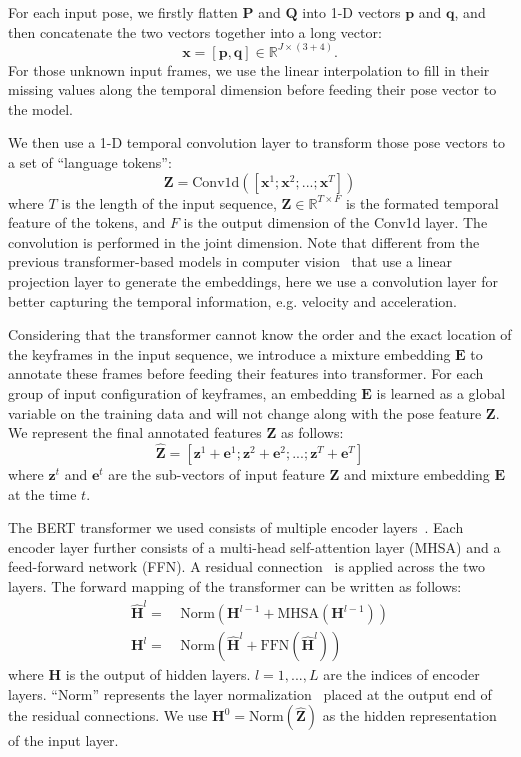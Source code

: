 \documentclass[10pt,twocolumn,letterpaper]{article}
\begin{document}
For each input pose, we firstly flatten $\bm{P}$ and $\bm{Q}$ into 1-D vectors $\bm{p}$ and $\bm{q}$, and then concatenate the two vectors together into a long vector:
\begin{equation}
\bm{x} = [\bm{p}, \bm{q}] \in \mathbb{R}^{J\times(3+4)}.
\end{equation}
For those unknown input frames, we use the linear interpolation to fill in their missing values along the temporal dimension before feeding their pose vector to the model.

We then use a 1-D temporal convolution layer to transform those pose vectors to a set of ``language tokens'':
\begin{equation}
\bm{Z} = \text{Conv1d}([\bm{x}^1;\bm{x}^2;...;\bm{x}^T])
\end{equation}
where $T$ is the length of the input sequence, $\bm{Z} \in \mathbb{R}^{T\times F}$ is the formated temporal feature of the tokens, and $F$ is the output dimension of the Conv1d layer. The convolution is performed in the joint dimension. Note that different from the previous transformer-based models in computer vision~\cite{dosovitskiy2020VIT} that use a linear projection layer to generate the embeddings, here we use a convolution layer for better capturing the temporal information, e.g. velocity and acceleration.

Considering that the transformer cannot know the order and the exact location of the keyframes in the input sequence, we introduce a mixture embedding $\bm{E}$ to annotate these frames before feeding their features into transformer. For each group of input configuration of keyframes, an embedding $\bm{E}$ is learned as a global variable on the training data and will not change along with the pose feature $\bm{Z}$. We represent the final annotated features $\bm{Z}$ as follows:
\begin{equation}
\bm{\hat{Z}} = [\bm{z}^1 + \bm{e}^1; \bm{z}^2 + \bm{e}^2; ...; \bm{z}^T+ \bm{e}^T]
\end{equation}
where $\bm{z}^t$ and $\bm{e}^t$ are the sub-vectors of input feature $\bm{Z}$ and mixture embedding $\bm{E}$ at the time $t$.

The BERT transformer we used consists of multiple encoder layers~\cite{devlin2018bert}. Each encoder layer further consists of a multi-head self-attention layer (MHSA) and a feed-forward network (FFN). A residual connection~\cite{he2016resnet} is applied across the two layers. The forward mapping of the transformer can be written as follows:
\begin{equation}
\begin{split}
\bm{\hat{H}}^l =&~\text{Norm}(\bm{H}^{l-1} + \text{MHSA}(\bm{H}^{l-1}))\\
\bm{H}^l =&~\text{Norm}(\bm{\hat{H}}^l + \text{FFN}(\bm{\hat{H}}^l))
\end{split}
\end{equation}
where $\bm{H}$ is the output of hidden layers. $l=1,...,L$ are the indices of encoder layers. ``Norm'' represents the layer normalization~\cite{ba2016layer} placed at the output end of the residual connections. We use $\bm{H}^0 = \text{Norm}(\bm{\hat{Z}})$ as the hidden representation of the input layer.
\end{document}
